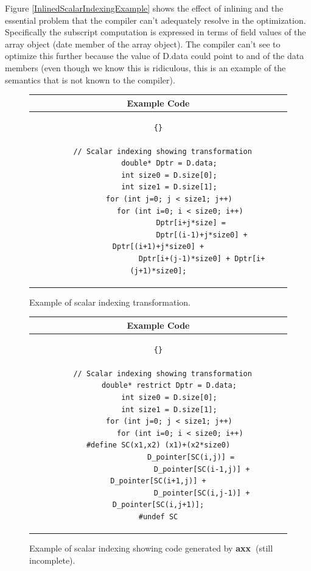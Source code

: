 \documentclass[10pt]{article}
\newcommand{\axx}{{\bf axx\ }}
\begin{document}
   Figure \ref{InlinedScalarIndexingExample} shows the effect of inlining and the essential problem that
the compiler can't adequately resolve in the optimization.  Specifically the subscript computation is
expressed in terms of field values of the array object (date member of the array object).  The compiler
can't see to optimize this further because the value of D.data could point to and of the data members
(even though we know this is ridiculous, this is an example of the semantics that is not known to the
compiler).

\begin{figure}[h]
\begin{center}
\begin{tabular}{|c|} \hline
 Example Code \\\hline\hline
\begin{lstlisting}{}

  // Scalar indexing showing transformation
     double* Dptr = D.data;
     int size0 = D.size[0];
     int size1 = D.size[1];
     for (int j=0; j < size1; j++)
          for (int i=0; i < size0; i++)
               Dptr[i+j*size] =
                    Dptr[(i-1)+j*size0] + Dptr[(i+1)+j*size0] +
                    Dptr[i+(j-1)*size0] + Dptr[i+(j+1)*size0];

\end{lstlisting}
\\\hline
\end{tabular}
\end{center}
\caption{ Example of scalar indexing transformation. }
\label{TransformedScalarIndexingExample}
\end{figure}

\begin{figure}[h]
\begin{center}
\begin{tabular}{|c|} \hline
 Example Code \\\hline\hline
\begin{lstlisting}{}

  // Scalar indexing showing transformation
     double* restrict Dptr = D.data;
     int size0 = D.size[0];
     int size1 = D.size[1];
     for (int j=0; j < size1; j++)
          for (int i=0; i < size0; i++)
#define SC(x1,x2) (x1)+(x2*size0)
               D_pointer[SC(i,j)] =
                    D_pointer[SC(i-1,j)] + D_pointer[SC(i+1,j)] +
                    D_pointer[SC(i,j-1)] + D_pointer[SC(i,j+1)];
#undef SC

\end{lstlisting}
\\\hline
\end{tabular}
\end{center}
\caption{ Example of scalar indexing showing code generated by \axx (still incomplete). }
\label{ROSETransformedScalarIndexingExample}
\end{figure}
\end{document}
